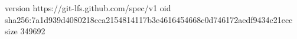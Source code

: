 version https://git-lfs.github.com/spec/v1
oid sha256:7a1d939d4080218cca2154814117b3e4616454668c0d746172aedf9434c21ecc
size 349692
